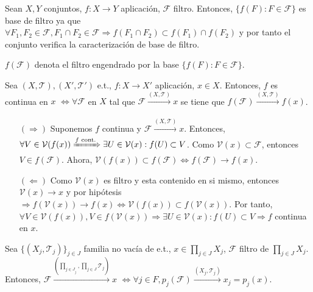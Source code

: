 \begin{obs}
  Sean $X,Y$ conjuntos, $f : X \to Y$ aplicación, $\mathcal{F}$ filtro. Entonces, $\{ f(F) : F \in \mathcal{F} \}$ es base de filtro ya que $\forall F_{1}, F_{2} \in \mathcal{F}, F_{1} \cap F_{2} \in \mathcal{F} \Rightarrow f(F_{1} \cap F_{2}) \subset f(F_{1}) \cap f(F_{2})$ y por tanto el conjunto verifica la caracterización de base de filtro.
\end{obs}

\begin{nota}
  $f(\mathcal{F})$ denota el filtro engendrado por la base $\{ f(F) : F \in \mathcal{F} \}$.
\end{nota}

\begin{prop}
  Sea $( X, \mathcal{T} ), ( X', \mathcal{T}' )$ e.t., $f : X \to X'$ aplicación, $x \in X$. Entonces, $f$ es continua en $x$ $\Leftrightarrow \forall \mathcal{F}$ en $X$ tal que $\mathcal{F} \xrightarrow[]{  ( X, \mathcal{T} )  } x$ se tiene que $f(\mathcal{F}) \xrightarrow[]{ ( X, \mathcal{T} ) } f(x)$.
\end{prop}

\begin{dem}
  \begin{enumerate}[label=(\roman*)]
    \item []
    \item [$(\Rightarrow)$] Suponemos $f$ continua y $\mathcal{F} \xrightarrow[]{ ( X, \mathcal{T} ) } x$. Entonces, $\forall V \in \mathcal{V}(f(x)) \xRightarrow[]{ f \text{ cont.} } \exists U \in \mathcal{V}(x) : f(U) \subset V$. Como $\mathcal{V}(x) \subset \mathcal{F}$, entonces $V \in f(\mathcal{F})$. Ahora, $\mathcal{V}(f(x)) \subset f(\mathcal{F}) \Leftrightarrow f(\mathcal{F}) \rightarrow f(x)$.
    \item [$(\Leftarrow)$] Como $\mathcal{V}(x)$ es filtro y esta contenido en si mismo, entonces $\mathcal{V}(x) \rightarrow x $ y por hipótesis $\Rightarrow f(\mathcal{V}(x)) \rightarrow f(x) \Leftrightarrow \mathcal{V}(f(x)) \subset f(\mathcal{V}(x))$. Por tanto, $\forall V \in \mathcal{V}(f(x)), V \in f(\mathcal{V}(x)) \Rightarrow \exists U \in \mathcal{V}(x) : f(U) \subset V \Rightarrow f$ continua en $x$.
  \end{enumerate}
\end{dem}

\begin{prop}
  Sea $\{ ( X_{j}, \mathcal{T}_{j} ) \}_{j \in J}$ familia no vacía de e.t., $ x \in \prod_{j \in J} X_{j}$, $\mathcal{ F}$ filtro de $\prod_{j \in J} X_{j}$. Entonces, $\mathcal{F} \xrightarrow[]{ ( \prod_{j \in J} _{j}, \prod_{j \in J} \mathcal{T}_{j} ) } x$ $ \Leftrightarrow \forall j \in F , p_{j}(\mathcal{F}) \xrightarrow[]{ ( X_{j}, \mathcal{T}_{j} ) } x_{j} = p_{j}(x)$.
\end{prop}

